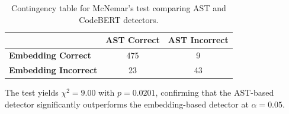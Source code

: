 \documentclass[11pt]{article}
\begin{document}
\begin{table}[h]
\centering
\begin{tabular}{@{}lcc@{}}
\toprule
& \textbf{AST Correct} & \textbf{AST Incorrect} \\
\midrule
\textbf{Embedding Correct} & 475 & 9 \\
\textbf{Embedding Incorrect} & 23 & 43 \\
\bottomrule
\end{tabular}
\caption{Contingency table for McNemar's test comparing AST and CodeBERT detectors.}
\label{tab:mcnemar}
\end{table}

The test yields $\chi^2 = 9.00$ with $p = 0.0201$, confirming that the AST-based detector significantly outperforms the embedding-based detector at $\alpha = 0.05$.
\end{document}
